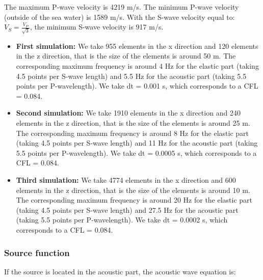 \documentclass{article}
\begin{document}
The maximum P-wave velocity is 4219 m/s. The minimum P-wave velocity (outside of the sea water) is 1589 m/s. With the S-wave velocity equal to: $V_S = \frac{V_P}{\sqrt{3}}$, the minimum S-wave velocity is 917 m/s.

\begin{itemize}
	\item \textbf{First simulation:} We take 955 elements in the x direction and 120 elements in the z direction, that is the size of the elements is around 50 m. The corresponding maximum frequency is around 4 Hz for the elastic part (taking 4.5 points per S-wave length) and 5.5 Hz for the acoustic part (taking 5.5 points per P-wavelength). We take dt = 0.001 s, which corresponds to a CFL = 0.084.
	\item \textbf{Second simulation:} We take 1910 elements in the x direction and 240 elements in the z direction, that is the size of the elements is around 25 m. The corresponding maximum frequency is around 8 Hz for the elastic part (taking 4.5 points per S-wave length) and 11 Hz for the acoustic part (taking 5.5 points per P-wavelength). We take dt = 0.0005 s, which corresponds to a CFL = 0.084.
	\item \textbf{Third simulation:} We take 4774 elements in the x direction and 600 elements in the z direction, that is the size of the elements is around 10 m. The corresponding maximum frequency is around 20 Hz for the elastic part (taking 4.5 points per S-wave length) and 27.5 Hz for the acoustic part (taking 5.5 points per P-wavelength). We take dt = 0.0002 s, which corresponds to a CFL = 0.084.
\end{itemize}

\subsubsection{Source function}

If the source is located in the acoustic part, the acoustic wave equation is:
\end{document}

